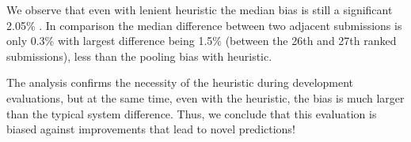 We observe that even with lenient \anydoc{} heuristic the median bias is still a significant 2.05\% \fone{}. In comparison the median difference between two adjacent submissions is only 0.3\%\fone{} with largest difference being 1.5\% \fone{} (between the 26th and 27th ranked submissions), less than the pooling bias with \anydoc{} heuristic.


The analysis confirms the necessity of the \anydoc{} heuristic during development evaluations,
  but at the same time, even with the heuristic, the bias is much larger than the typical system difference.
Thus, we conclude that this evaluation is biased against improvements that lead to novel predictions!

